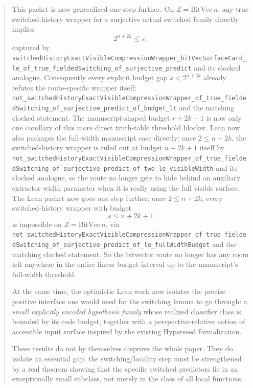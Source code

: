 \documentclass[11pt]{article}
\theoremstyle{remark}
\begin{document}
\begin{abstract}
This packet is now generalized one step further.  On \(Z = \mathrm{BitVec}\,n\),
any true switched-history wrapper for a surjective actual switched family
directly implies
\[
  2^{n+2k} \le s,
\]
captured by
\texttt{switchedHistoryExactVisibleCompressionWrapper\_bitVecSurfaceCard\_le\_of\_true\_fieldedSwitching\_of\_surjective\_predict}
and its clocked analogue.  Consequently every explicit budget gap
\(s < 2^{n+2k}\) already refutes the route-specific wrapper itself:
\texttt{not\_switchedHistoryExactVisibleCompressionWrapper\_of\_true\_fieldedSwitching\_of\_surjective\_predict\_of\_budget\_lt}
and the matching clocked statement.  The manuscript-shaped budget
\(r + 2k + 1\) is now only one corollary of this more direct truth-table
threshold blocker.  Lean now also packages the full-width manuscript case
directly: once \(2 \le n + 2k\), the switched-history wrapper is ruled out at
budget \(n + 2k + 1\) itself by
\texttt{not\_switchedHistoryExactVisibleCompressionWrapper\_of\_true\_fieldedSwitching\_of\_surjective\_predict\_of\_two\_le\_visibleWidth}
and its clocked analogue, so the route no longer gets to hide behind an
auxiliary extractor-width parameter when it is really using the full visible
surface.  The Lean packet now goes one step further: once \(2 \le n + 2k\),
every switched-history wrapper with budget
\[
  s \le n + 2k + 1
\]
is impossible on \(Z = \mathrm{BitVec}\,n\), via
\texttt{not\_switchedHistoryExactVisibleCompressionWrapper\_of\_true\_fieldedSwitching\_of\_surjective\_predict\_of\_le\_fullWidthBudget}
and the matching clocked statement.  So the bitvector route no longer has any
room left anywhere in the entire linear budget interval up to the manuscript's
full-width threshold.

At the same time, the optimistic Lean work now isolates the precise positive interface one
would need for the switching lemma to go through: a \emph{small explicitly encoded
hypothesis family} whose realized classifier class is bounded by its code budget, together
with a perspective-relative notion of accessible input surface inspired by the existing
Hyperseed formalization.

These results do not by themselves disprove the whole paper.  They do isolate an essential gap:
the switching/locality step must be strengthened by a real theorem showing that the specific
switched predictors lie in an exceptionally small subclass, not merely in the class of all local
functions.
\end{abstract}

\tableofcontents
\end{document}
